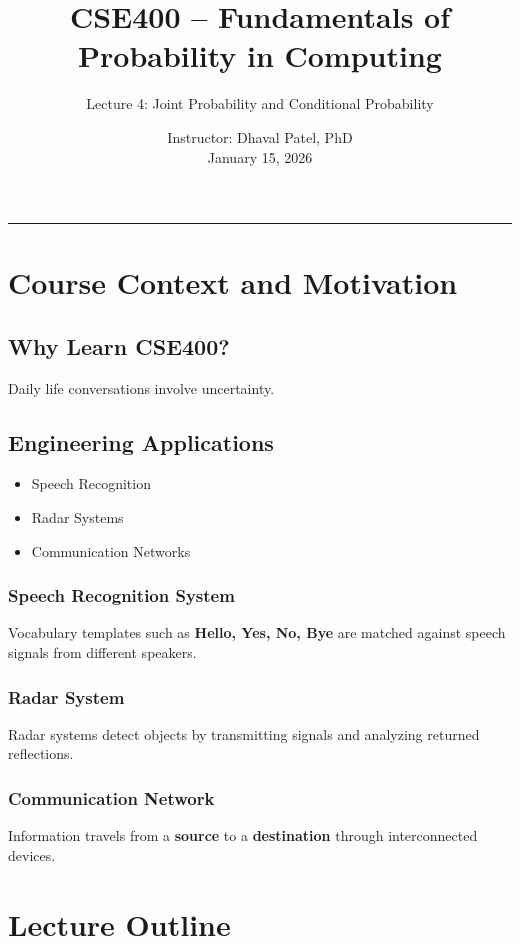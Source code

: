 \documentclass[12pt]{article}
\title{\textbf{CSE400 -- Fundamentals of Probability in Computing}}
\author{Lecture 4: Joint Probability and Conditional Probability}
\date{Instructor: Dhaval Patel, PhD \\ January 15, 2026}
\begin{document}
\maketitle
\hrule
\vspace{1em}

\section{Course Context and Motivation}

\subsection{Why Learn CSE400?}

Daily life conversations involve uncertainty.

\subsection{Engineering Applications}

\begin{itemize}
\item Speech Recognition
\item Radar Systems
\item Communication Networks
\end{itemize}

\subsubsection*{Speech Recognition System}
Vocabulary templates such as \textbf{Hello, Yes, No, Bye} are matched against speech signals from different speakers.

\subsubsection*{Radar System}
Radar systems detect objects by transmitting signals and analyzing returned reflections.

\subsubsection*{Communication Network}
Information travels from a \textbf{source} to a \textbf{destination} through interconnected devices.

\section{Lecture Outline}
\end{document}
